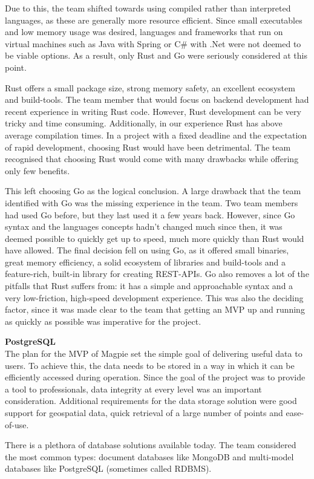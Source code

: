 Due to this, the team shifted towards using compiled rather than interpreted
languages, as these are generally more resource efficient. Since small
executables and low memory usage was desired, languages and frameworks that run
on virtual machines such as Java with Spring or C\# with .Net were not deemed to
be viable options. As a result, only Rust and Go were seriously considered at
this point.

Rust offers a small package size, strong memory safety, an excellent
ecosystem and build-tools. The team member that would focus on backend
development had recent experience in writing Rust code. However, Rust
development can be very tricky and time consuming. Additionally, in our
experience Rust has above average compilation times. In a project with a fixed
deadline and the expectation of rapid development, choosing Rust would have been
detrimental. The team recognised that choosing Rust would come with many
drawbacks while offering only few benefits.

This left choosing Go as the logical conclusion. A large drawback that the team
identified with Go was the missing experience in the team. Two team members had
used Go before, but they last used it a few years back. However, since Go syntax
and the languages concepts hadn't changed much since then, it was deemed
possible to quickly get up to speed, much more quickly than Rust would have
allowed. The final decision fell on using Go, as it offered small binaries,
great memory efficiency, a solid ecosystem of libraries and build-tools and a
feature-rich, built-in library for creating REST-APIs. Go also removes a lot of
the pitfalls that Rust suffers from: it has a simple and approachable syntax and
a very low-friction, high-speed development experience. This was also the
deciding factor, since it was made clear to the team that getting an MVP up and
running as quickly as possible was imperative for the project.

\textbf{PostgreSQL}\\
The plan for the MVP of Magpie set the simple goal of delivering useful data to
users. To achieve this, the data needs to be stored in a way in which it can be
efficiently accessed during operation. Since the goal of the project was to
provide a tool to professionals, data integrity at every level was an important
consideration. Additional requirements for the data storage solution were good
support for geospatial data, quick retrieval of a large number of points and
ease-of-use.

There is a plethora of database solutions available today. The team considered
the most common types: document databases like MongoDB and multi-model databases
like PostgreSQL (sometimes called RDBMS).

